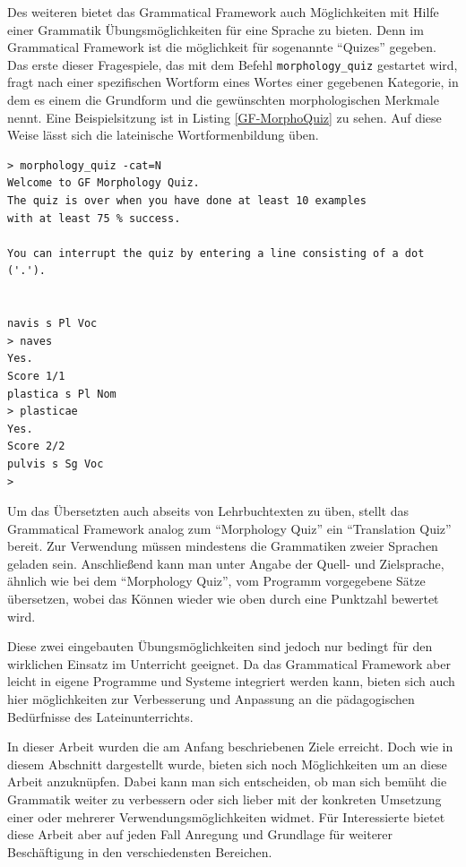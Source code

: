 Des weiteren bietet das Grammatical Framework auch Möglichkeiten mit Hilfe einer Grammatik Übungsmöglichkeiten für eine Sprache zu bieten. Denn im Grammatical Framework ist die möglichkeit für sogenannte ``Quizes'' gegeben. Das erste dieser Fragespiele, das mit dem Befehl \texttt{morphology\_quiz} gestartet wird, fragt nach einer spezifischen Wortform eines Wortes einer gegebenen Kategorie, in dem es einem die Grundform und die gewünschten morphologischen Merkmale nennt. Eine Beispielsitzung ist in Listing \ref{GF-MorphoQuiz} zu sehen. Auf diese Weise lässt sich die lateinische Wortformenbildung üben.
\begin{lstlisting}[float=h!tp,caption={Eine Beispielsitzung des Grammatical Framework Morphology Quiz},label={GF-MorphoQuiz},basicstyle=\small]
> morphology_quiz -cat=N
Welcome to GF Morphology Quiz.
The quiz is over when you have done at least 10 examples
with at least 75 % success.

You can interrupt the quiz by entering a line consisting of a dot ('.').


navis s Pl Voc
> naves
Yes.
Score 1/1
plastica s Pl Nom
> plasticae
Yes.
Score 2/2
pulvis s Sg Voc
>
\end{lstlisting}
Um das Übersetzten auch abseits von Lehrbuchtexten zu üben, stellt das Grammatical Framework analog zum ``Morphology Quiz'' ein ``Translation Quiz'' bereit. Zur Verwendung müssen mindestens die Grammatiken zweier Sprachen geladen sein. Anschließend kann man unter Angabe der Quell- und Zielsprache, ähnlich wie bei dem ``Morphology Quiz'', vom Programm vorgegebene Sätze übersetzen, wobei das Können wieder wie oben durch eine Punktzahl bewertet wird. \par
Diese zwei eingebauten Übungsmöglichkeiten sind jedoch nur bedingt für den wirklichen Einsatz im Unterricht geeignet. Da das Grammatical Framework aber leicht in eigene Programme und Systeme integriert werden kann, bieten sich auch hier möglichkeiten zur Verbesserung und Anpassung an die pädagogischen Bedürfnisse des Lateinunterrichts.\par
In dieser Arbeit wurden die am Anfang beschriebenen Ziele erreicht. Doch wie in diesem Abschnitt dargestellt wurde, bieten sich noch Möglichkeiten um an diese Arbeit anzuknüpfen. Dabei kann man sich entscheiden, ob man sich bemüht die Grammatik weiter zu verbessern oder sich lieber mit der konkreten Umsetzung einer oder mehrerer Verwendungsmöglichkeiten widmet. Für Interessierte bietet diese Arbeit aber auf jeden Fall Anregung und Grundlage für weiterer Beschäftigung in den verschiedensten Bereichen.
